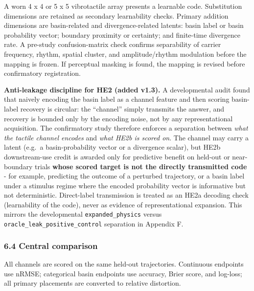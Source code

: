 \documentclass[
  11pt,
]{article}
\begin{document}
A worn 4 x 4 or 5 x 5 vibrotactile array
presents a learnable code. Substitution
dimensions are retained as secondary
learnability checks. Primary addition dimensions
are basin-related and divergence-related
latents: basin label or basin probability
vector; boundary proximity or certainty; and
finite-time divergence rate. A pre-study
confusion-matrix check confirms separability of
carrier frequency, rhythm, spatial cluster, and
amplitude/rhythm modulation before the mapping
is frozen. If perceptual masking is found, the
mapping is revised before confirmatory
registration.

\textbf{Anti-leakage discipline for HE2 (added
v1.3).} A developmental audit found that naively
encoding the basin label as a channel feature
and then scoring basin-label recovery is
circular: the ``channel'' simply transmits the
answer, and recovery is bounded only by the
encoding noise, not by any representational
acquisition. The confirmatory study therefore
enforces a separation between \emph{what the
tactile channel encodes} and \emph{what HE2b is
scored on}. The channel may carry a latent
(e.g.~a basin-probability vector or a divergence
scalar), but HE2b downstream-use credit is
awarded only for predictive benefit on held-out
or near-boundary trials \textbf{whose scored
target is not the directly transmitted code} -
for example, predicting the outcome of a
perturbed trajectory, or a basin label under a
stimulus regime where the encoded probability
vector is informative but not deterministic.
Direct-label transmission is treated as an HE2a
decoding check (learnability of the code), never
as evidence of representational expansion. This
mirrors the developmental
\texttt{expanded\_physics} versus
\texttt{oracle\_leak\_positive\_control}
separation in Appendix F.

\subsubsection{6.4 Central
comparison}\label{central-comparison}

All channels are scored on the same held-out
trajectories. Continuous endpoints use nRMSE;
categorical basin endpoints use accuracy, Brier
score, and log-loss; all primary placements are
converted to relative distortion.
\end{document}
